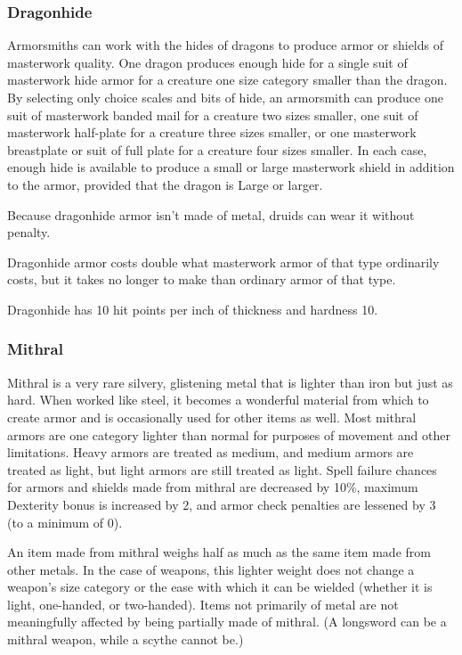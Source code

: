 \subsubsection{Dragonhide}

Armorsmiths can work with the hides of dragons to produce armor or shields of masterwork quality. One dragon produces enough hide for a single suit of masterwork hide armor for a creature one size category smaller than the dragon. By selecting only choice scales and bits of hide, an armorsmith can produce one suit of masterwork banded mail for a creature two sizes smaller, one suit of masterwork half-plate for a creature three sizes smaller, or one masterwork breastplate or suit of full plate for a creature four sizes smaller. In each case, enough hide is available to produce a small or large masterwork shield in addition to the armor, provided that the dragon is Large or larger.

Because dragonhide armor isn't made of metal, druids can wear it without penalty.

Dragonhide armor costs double what masterwork armor of that type ordinarily costs, but it takes no longer to make than ordinary armor of that type.

Dragonhide has 10 hit points per inch of thickness and hardness 10.

\subsubsection{Mithral}

Mithral is a very rare silvery, glistening metal that is lighter than iron but just as hard. When worked like steel, it becomes a wonderful material 
from which to create armor and is occasionally used for other items as well. Most mithral armors are one category lighter than normal for purposes of movement and other limitations. Heavy armors are treated as medium, and medium armors are treated as light, but light armors are still treated as light. Spell failure chances for armors and shields made from mithral are decreased by 10\%, maximum Dexterity bonus is increased by 2, and armor check penalties are lessened by 3 (to a minimum of 0).

An item made from mithral weighs half as much as the same item made from other metals. In the case of weapons, this lighter weight does not change a weapon's size category or the ease with which it can be wielded (whether it is light, one-handed, or two-handed). Items not primarily of metal are not meaningfully affected by being partially made of mithral. (A longsword can be a mithral weapon, while a scythe cannot be.)

